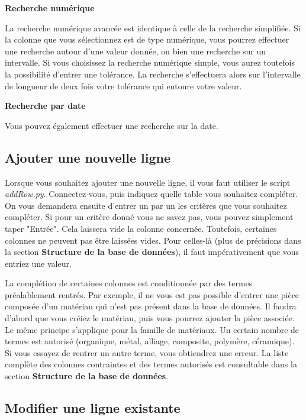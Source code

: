 \documentclass[12pt,a4paper]{article}
\begin{document}
        \medskip
        \textbf{Recherche numérique}
        
        La recherche numérique avancée est identique à celle de la recherche simplifiée.
        Si la colonne que vous sélectionnez est de type numérique, vous pourrez effectuer une recherche autour d'une valeur donnée,
        ou bien une recherche sur un intervalle. Si vous choisissez la recherche numérique simple, vous aurez toutefois
        la possibilité d'entrer une tolérance. La recherche s'effectuera alors sur l'intervalle de longueur de deux fois votre tolérance
        qui entoure votre valeur.

        \medskip
        \textbf{Recherche par date}
        
        Vous pouvez également effectuer une recherche sur la date.


\bigskip
\subsection{Ajouter une nouvelle ligne}

    Lorsque vous souhaitez ajouter une nouvelle ligne, il vous faut utiliser le script \emph{addRow.py}.
    Connectez-vous, puis indiquez quelle table vous souhaitez compléter.
    On vous demandera ensuite d'entrer un par un les critères que vous souhaitez compléter.
    Si pour un critère donné vous ne savez pas, vous pouvez simplement taper "Entrée".
    Cela laissera vide la colonne concernée.
    Toutefois, certaines colonnes ne peuvent pas être laissées vides. Pour celles-là (plus de précisions dans
    la section \textbf{Structure de la base de données}), il faut impérativement que vous entriez une valeur.

    La complétion de certaines colonnes est conditionnée par des termes préalablement rentrés. Par exemple,
    il ne vous est pas possible d'entrer une pièce composée d'un matériau qui n'est pas présent dans la base
    de données. Il faudra d'abord que vous créiez le matériau, puis vous pourrez ajouter la pièce associée.
    Le même principe s'applique pour la famille de matériaux. Un certain nombre de termes est autorisé (organique,
    métal, alliage, composite, polymère, céramique). Si vous essayez de rentrer un autre terme, vous obtiendrez une
    erreur. La liste complète des colonnes contraintes et des termes autorisés est consultable dans la section
    \textbf{Structure de la base de données}.


\bigskip
\subsection{Modifier une ligne existante}
    
\end{document}
